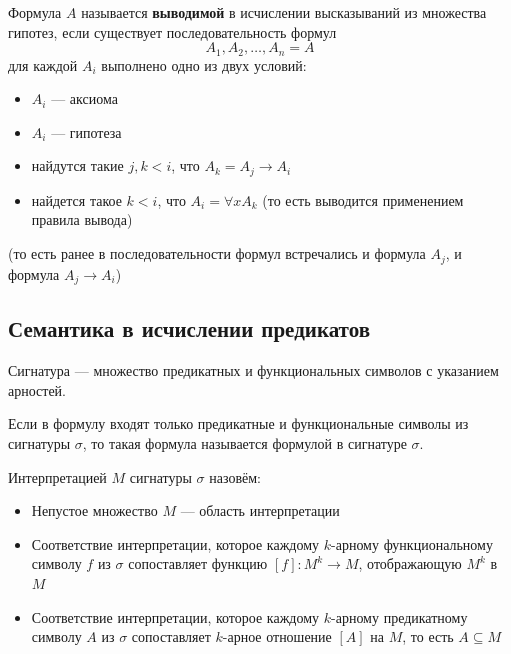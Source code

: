 \documentclass[11pt]{article}
\begin{document}
\begin{definition}
    Формула $A$ называется \textbf{выводимой} в исчислении высказываний из множества гипотез, 
    если существует последовательность формул \[A_1, A_2, \dots, A_n = A\]
    для каждой $A_i$ выполнено одно из двух условий:
    \begin{itemize}
        \item $A_i$ --- аксиома
        \item $A_i$ --- гипотеза
        \item найдутся такие $j, k < i$, что $A_k = A_j \to A_i$ 
        \item  найдется такое $k < i$, что $A_i = \forall x A_k$ (то есть выводится
        применением правила вывода)
    \end{itemize}
    (то есть ранее в последовательности формул встречались и формула $A_j$, и формула 
    $A_j \to A_i$)
\end{definition}

\subsection{Семантика в исчислении предикатов}
\begin{definition}
    Сигнатура --- множество предикатных и функциональных символов с указанием арностей.
\end{definition}

\begin{definition}
    Если в формулу входят только предикатные и функциональные символы из
    сигнатуры $\sigma$, то такая формула называется формулой в сигнатуре $\sigma$.
\end{definition}

\begin{definition}
    Интерпретацией $M$ сигнатуры $\sigma$ назовём:
    \begin{itemize}
        \item Непустое множество $M$ --- область интерпретации
        \item Соответствие интерпретации, которое каждому $k$-арному функциональному
        символу $f$ из $\sigma$ сопоставляет функцию $[f]: M^k \to M$, отображающую $M^k$ в $M$
        \item Соответствие интерпретации, которое каждому $k$-арному предикатному символу
        $A$ из $\sigma$ сопоставляет $k$-арное отношение $[A]$ на $M$, то есть $A \subseteq M$
    \end{itemize}
\end{definition}
\end{document}
